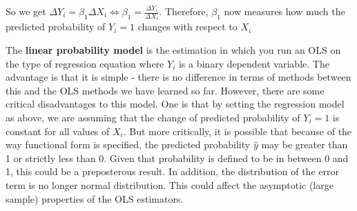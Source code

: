 \documentclass[12pt]{article}
\theoremstyle{definition}
\theoremstyle{property}
\theoremstyle{assumption}
\theoremstyle{example}
\theoremstyle{comment}
\begin{document}
So we get $\Delta Y_i = \beta_1\Delta X_i\iff\beta_1 =\frac{\Delta Y_i}{\Delta X_i}$. Therefore, $\beta_1$ now measures how much the predicted probability of $Y_i=1$ changes with respect to $X_i$ \par\medskip
The \textbf{linear probability model} is the estimation in which you run an OLS on the type of regression equation where $Y_i$ is a binary dependent variable. The advantage is that it is simple - there is no difference in terms of methods between this and the OLS methods we have learned so far. However, there are some critical disadvantages to this model. One is that by setting the regression model as above, we are assuming that the change of predicted probability of $Y_i=1$ is constant for all values of $X_i$. But more critically, it is possible that because of the way functional form is specified, the predicted probability $\hat{y}$ may be greater than 1 or strictly less than 0. Given that probability is defined to be in between 0 and 1, this could be a preposterous result. In addition, the distribution of the error term is no longer normal distribution. This could affect the asymptotic (large sample) properties of the OLS estimators. \par\medskip
\end{document}
